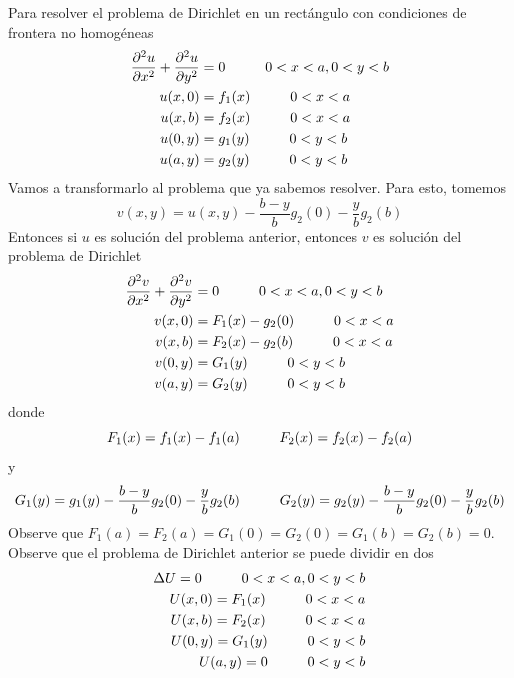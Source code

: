 \documentclass[11pt]{book}
\theoremstyle{plain}
\theoremstyle{definition}
\begin{document}
    Para resolver el problema de Dirichlet en un rectángulo con condiciones de frontera no homogéneas
    \begin{align*}
        \frac{\partial^{2}u}{\partial x^{2}} + \frac{\partial^{2}u}{\partial y^{2}} &= 0 \hspace{10mm} 0<x<a, 0<y<b\\
        u(x,0) &= f_{1}(x) \hspace{10mm} 0<x<a\\
        u(x,b) &= f_{2}(x) \hspace{10mm} 0<x<a\\
        u(0,y) &= g_{1}(y) \hspace{10mm} 0<y<b\\
        u(a,y) &= g_{2}(y) \hspace{10mm} 0<y<b
    \end{align*}
    Vamos a transformarlo al problema que ya sabemos resolver. Para esto, tomemos
    \[
        v(x,y) = u(x,y) - \frac{b-y}{b}g_{2}(0) - \frac{y}{b}g_{2}(b)
    \]
    Entonces si $u$ es solución del problema anterior, entonces $v$ es solución del problema de Dirichlet
    \begin{align*}
        \frac{\partial^{2}v}{\partial x^{2}} + \frac{\partial^{2}v}{\partial y^{2}} &= 0 \hspace{10mm} 0<x<a, 0<y<b\\
        v(x,0) &= F_{1}(x) - g_{2}(0) \hspace{10mm} 0<x<a\\
        v(x,b) &= F_{2}(x) - g_{2}(b) \hspace{10mm} 0<x<a\\
        v(0,y) &= G_{1}(y) \hspace{10mm} 0<y<b\\
        v(a,y) &= G_{2}(y) \hspace{10mm} 0<y<b
    \end{align*}
    donde
    \[
        F_{1}(x) = f_{1}(x) - f_1(a) \hspace{10mm} F_{2}(x) = f_{2}(x) - f_2(a)
    \]
    y
    \[
        G_{1}(y) = g_{1}(y) - \frac{b-y}{b}g_{2}(0) - \frac{y}{b}g_{2}(b) \hspace{10mm} G_{2}(y) = g_{2}(y) - \frac{b-y}{b}g_{2}(0) - \frac{y}{b}g_{2}(b)
    \]
    Observe que $F_{1}(a) = F_{2}(a) = G_{1}(0) = G_{2}(0) = G_{1}(b) = G_{2}(b) = 0$. Observe que el problema de Dirichlet anterior se puede dividir en dos
    \begin{align*}
        \Delta U = 0 \hspace{10mm} 0<x<a, 0<y<b\\
        U(x,0) = F_{1}(x) \hspace{10mm} 0<x<a\\
        U(x,b) = F_{2}(x) \hspace{10mm} 0<x<a\\
        U(0,y) = G_{1}(y) \hspace{10mm} 0<y<b\\
        U(a,y) = 0 \hspace{10mm} 0<y<b
    \end{align*}
\end{document}
